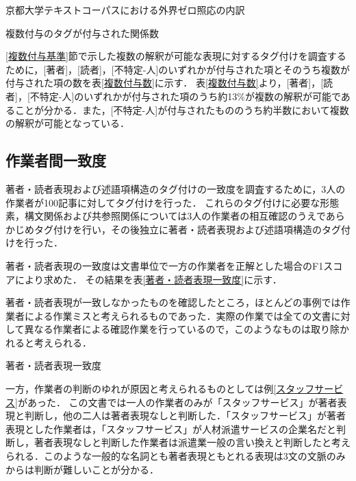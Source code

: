 \documentclass[japanese]{jnlp_1.4}
\begin{document}
\begin{table}[t]
\caption{京都大学テキストコーパスにおける外界ゼロ照応の内訳}
\label{KTCの外界ゼロ照応の内訳}

\end{table}
\begin{table}[t]
\caption{複数付与のタグが付与された関係数}
\label{複数付与数}

\end{table}

\ref{複数付与基準}節で示した複数の解釈が可能な表現に対するタグ付けを調査するために，[著者]，[読者]，[不特定-人]のいずれかが付与された項とそのうち複数が付与された項の数を表\ref{複数付与数}に示す．
表\ref{複数付与数}より，[著者]，[読者]，[不特定-人]のいずれかが付与された項のうち約13\%が複数の解釈が可能であることが分かる．また，[不特定-人]が付与されたもののうち約半数において複数の解釈が可能となっている．


\subsection{作業者間一致度}

著者・読者表現および述語項構造のタグ付けの一致度を調査するために，3人の作業者が100記事に対してタグ付けを行った．
これらのタグ付けに必要な形態素，構文関係および共参照関係については3人の作業者の相互確認のうえであらかじめタグ付けを行い，その後独立に著者・読者表現および述語項構造のタグ付けを行った．

著者・読者表現の一致度は文書単位で一方の作業者を正解とした場合のF1スコアにより求めた．
その結果を表\ref{著者・読者表現一致度}に示す．

著者・読者表現が一致しなかったものを確認したところ，ほとんどの事例では作業者による作業ミスと考えられるものであった．実際の作業では全ての文書に対して異なる作業者による確認作業を行っているので，このようなものは取り除かれると考えられる．

\begin{table}[t]
\caption{著者・読者表現一致度}
\label{著者・読者表現一致度}

\end{table}

一方，作業者の判断のゆれが原因と考えられるものとしては例\ref{スタッフサービス}があった．
この文書では一人の作業者のみが「スタッフサービス」が著者表現と判断し，他の二人は著者表現なしと判断した．「スタッフサービス」が著者表現とした作業者は，「スタッフサービス」が人材派遣サービスの企業名だと判断し，著者表現なしと判断した作業者は派遣業一般の言い換えと判断したと考えられる．このような一般的な名詞とも著者表現ともとれる表現は3文の文脈のみからは判断が難しいことが分かる．
\end{document}
